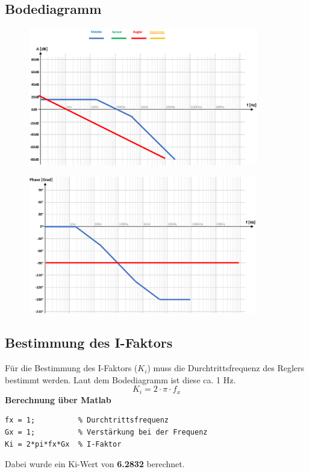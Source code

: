 \documentclass[twoside]{article}
\begin{document}
\subsection{Bodediagramm}
\begin{figure}[h]
    \centering
    \includegraphics[width=1\linewidth, height = 6cm]{img/Bode_04.png}
\end{figure}
\begin{figure}[h]
    \centering
    \includegraphics[width=1\linewidth, height = 6cm]{img/Bode_05.png}
\end{figure}

\subsection{Bestimmung des I-Faktors}
Für die Bestimmung des I-Faktors ($K_i$) muss die Durchtrittsfrequenz des Reglers bestimmt werden. Laut dem Bodediagramm ist diese ca. 1 Hz.
\begin{equation}
K_i=2\cdot \pi \cdot f_x
\end{equation}
\noindent
\textbf{Berechnung über Matlab}
\begin{verbatim}
fx = 1;          % Durchtrittsfrequenz
Gx = 1;          % Verstärkung bei der Frequenz
Ki = 2*pi*fx*Gx  % I-Faktor
\end{verbatim}
Dabei wurde ein Ki-Wert von \textbf{6.2832} berechnet.
\newpage
\end{document}
